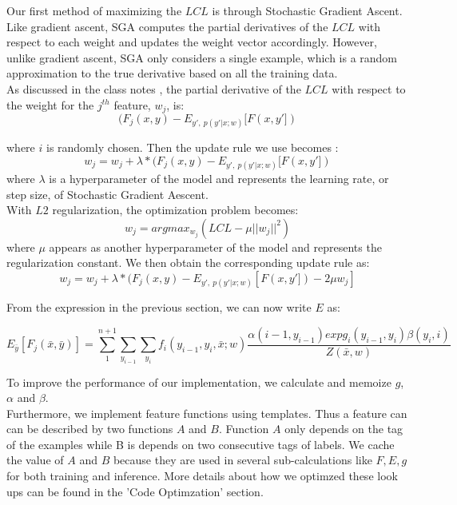 \documentclass[11pt,a4paper,oneside]{article}
\begin{document}
Our first method of maximizing the $LCL$ is through Stochastic Gradient Ascent. Like gradient ascent, SGA computes the partial derivatives of the $LCL$ with respect to each weight and updates the weight vector accordingly. However, unlike gradient ascent, SGA only considers a single example, which is a random approximation to the true derivative based on all the training data.\\

As discussed in the class notes \cite{classNotes}, the partial derivative of the $LCL$ with respect to the weight for the $j^{th}$ feature, $w_j$, is:
\begin{equation}
(F_j(x, y) - E_{y',~p(y'|x;w)}[F(x,y'])
\end{equation}


where $i$ is randomly chosen. Then the update rule we use becomes :
\begin{equation}
w_j = w_j + \lambda * (F_j(x, y) - E_{y',~p(y'|x;w)}[F(x,y'])
\end{equation}
where $\lambda$ is a hyperparameter of the model and represents the learning rate, or step size, of Stochastic Gradient Aescent.\\

With $L2$ regularization, the optimization problem becomes:
\begin{equation}
w_j = argmax_{w_j} (LCL - \mu||w_j||^2)
\end{equation}
where $\mu$ appears as another hyperparameter of the model and represents the regularization constant. We then obtain the corresponding update rule as:
\begin{equation}
w_j = w_j + \lambda * (F_j(x, y) - E_{y',~p(y'|x;w)}[F(x,y']) - 2\mu w_j]
\end{equation}

From the expression in the previous section, we can now write $E$ as:

\begin{equation}
E_{\bar{y}}[F_j(\bar{x}, \bar{y})] = \sum_1^{n+1}{\sum_{y_{i-1}}{\sum_{y_i}}}f_i(y_{i-1},y_i,\bar{x};w)\frac{\alpha(i-1, y_{i-1})exp g_i(y_{i-1},y_i) \beta(y_i,i)}{Z(\bar{x}, w)}
\end{equation}

To improve the performance of our implementation, we calculate and memoize $g$, $\alpha$ and $\beta$.\\

Furthermore, we implement feature functions using templates. Thus a feature can can be described by two functions $A$ and $B$. Function $A$ only depends on the tag of the examples while B is depends on two consecutive tags of labels. We cache the value of $A$ and $B$ because they are used in several sub-calculations like $F, E, g$ for both training and inference. More details about how we optimzed these look ups can be found in the 'Code Optimzation' section.\\
\end{document}
